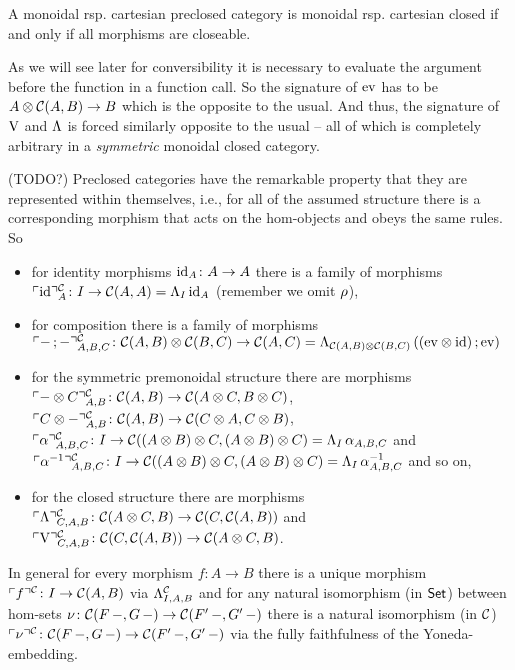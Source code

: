 \documentclass[runningheads,envcountsame]{llncs}
\begin{document}
\begin{remark}
    A monoidal rsp. cartesian preclosed category is monoidal rsp. cartesian closed if and only if all morphisms are closeable.
\end{remark}

\begin{remark}
    As we will see later for conversibility it is necessary to evaluate the argument before the function in a function call. So the signature of $\eval$ has to be $\tensor{A}{\homC{A}{B}} \to B$ which is the opposite to the usual. And thus, the signature of $\uncurry$ and $\curry$ is forced similarly opposite to the usual -- all of which is completely arbitrary in a \emph{symmetric} monoidal closed category.
\end{remark}

(TODO?) Preclosed categories have the remarkable property that they are represented within themselves, i.e., for all of the assumed structure there is a corresponding morphism that acts on the hom-objects and obeys the same rules. So
\begin{itemize}
    \item for identity morphisms $\id_A\colon A \to A$ there is a family of morphisms $\name[\C]{\id}_A\colon I \to \homC{A}{A} = \curry_I\,\id_A$ (remember we omit $\unitr$),
    \item for composition there is a family of morphisms $\name[\C]{\comp{-}{-}}_{A,B,C}\colon \tensor{\homC{A}{B}}{\homC{B}{C}} \to \homC{A}{C} = \curry_{\tensor{\homC{A}{B}}{\homC{B}{C}}}\,(\comp{(\tensor{\eval}{\id})}{\eval})$
    \item for the symmetric premonoidal structure there are morphisms $\name[\C]{\tensor{-}{C}}_{A,B}\colon \homC{A}{B} \to \homC{\tensor{A}{C}}{\tensor{B}{C}}$, $\name[\C]{\tensor{C}{-}}_{A,B}\colon \homC{A}{B} \to \homC{\tensor{C}{A}}{\tensor{C}{B}}$, $\name[\C]{\assoc}_{A,B,C}\colon I \to \homC{\tensor{(\tensor{A}{B})}{C}}{\tensor{(\tensor{A}{B})}{C}} = \curry_I\,\assoc_{A,B,C}$ and $\name[\C]{\assoc^{-1}}_{A,B,C}\colon I \to \homC{\tensor{(\tensor{A}{B})}{C}}{\tensor{(\tensor{A}{B})}{C}} = \curry_I\,\assoc^{-1}_{A,B,C}$ and so on,
    \item for the closed structure there are morphisms $\name[\C]{\curry}_{C,A,B}\colon \homC{\tensor{A}{C}}{B} \to \homC{C}{\homC{A}{B}}$ and $\name[\C]{\uncurry}_{C,A,B}\colon \homC{C}{\homC{A}{B}} \to \homC{\tensor{A}{C}}{B}$.
\end{itemize}
In general for every morphism $f\colon A \to B$ there is a unique morphism $\name[\C]{f}\colon I \to \homC{A}{B}$ via $\curry[\C]_{I, A, B}$ and for any natural isomorphism (in $\mathsf{Set}$) between hom-sets $\nu\colon \mathcal{C}(F\,-, G\,-) \to \mathcal{C}(F'\,-, G'\,-)$ there is a natural isomorphism (in $\mathcal{C}$) $\name[\C]{\nu}\colon \homC{F\,-}{G\,-} \to \homC{F'\,-}{G'\,-}$ via the fully faithfulness of the Yoneda-embedding.
\end{document}
